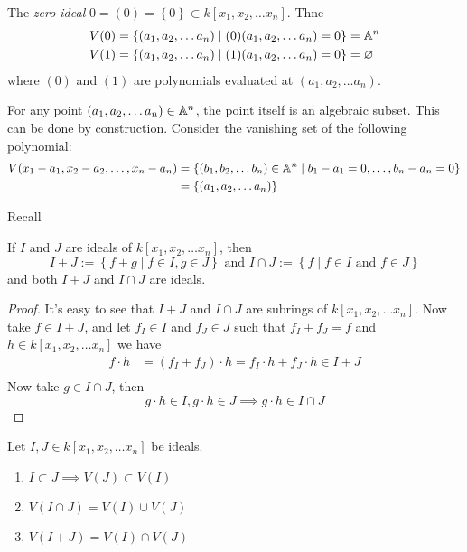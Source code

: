 \begin{example}
The \textit{zero ideal} $0 = \left( 0 \right) = \left\{ 0 \right\} \subset k[x_1, x_2, \ldots x_n]$. Thne
\begin{align*}
V(0) &= \left\{ (a_1, a_2, \ldots a_n) \mid (0)(a_1, a_2, \ldots a_n ) = 0 \right\} = \mathbb A^n \\
V(1) &= \left\{ (a_1, a_2, \ldots a_n) \mid (1)(a_1, a_2, \ldots a_n ) = 0 \right\} = \varnothing
\end{align*}
where $(0)$ and $(1)$ are polynomials evaluated at $(a_1, a_2, \ldots a_n)$. 
\end{example}

\begin{example}
For any point $(a_1, a_2, \ldots a_n) \in \mathbb A^n$, the point itself is an algebraic subset. This can be done by construction. Consider the vanishing set of the following polynomial:
\begin{align*}
V(x_1 - a_1, x_2 - a_2, \ldots, x_n - a_n) &= \left\{ (b_1, b_2, \ldots b_n) \in \mathbb A^n \mid b_1 - a_1 = 0, \ldots, b_n - a_n = 0 \right\} \\ 
&= \left\{ (a_1, a_2, \ldots a_n ) \right\}
\end{align*}
\end{example}

\begin{proposition}
Recall

If $I$ and $J$ are ideals of $k[x_1, x_2, \ldots x_n]$, then 
\[ I + J := \left\{ f + g \mid f \in I, g \in J \right\} \text{ and } I \cap J := \left\{ f \mid f \in I \text{ and } f \in J \right\}\]
and both $I + J$ and $I \cap J$ are ideals.
\end{proposition}
\begin{proof}
It's easy to see that $I + J$ and $I \cap J$ are subrings of $k[x_1, x_2, \ldots x_n]$. Now take $f \in I + J$, and let $f_I \in I$ and $f_J \in J$ such that $f_I + f_J = f$ and $h \in k[x_1, x_2, \ldots x_n]$ we have
\begin{align*}
f \cdot h &= (f_I + f_J) \cdot h = f_I \cdot h + f_J \cdot h \in I + J \\
\end{align*}
Now take $g \in I \cap J$, then 
\[ g \cdot h \in I, g \cdot h \in J \implies g \cdot h \in I \cap J \]
\end{proof}
\begin{proposition}
Let $I, J \in k[x_1, x_2, \ldots x_n]$ be ideals.
\begin{enumerate}
	\item $I \subset J \implies V(J) \subset V(I)$ 
	\item $V(I \cap J) = V(I) \cup V(J)$
	\item $V(I + J) = V(I) \cap V(J)$
\end{enumerate}
\end{proposition}

